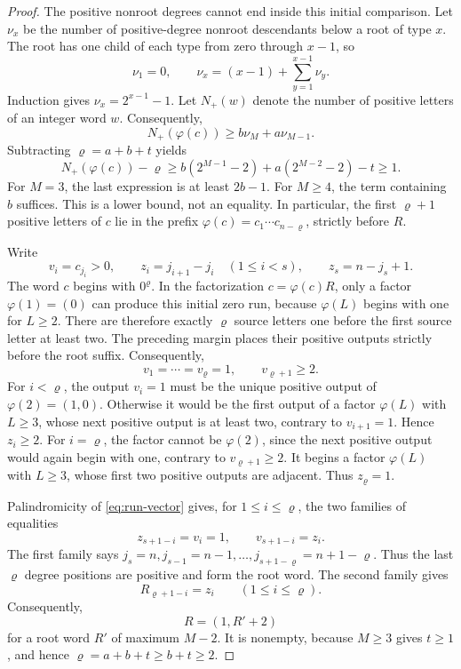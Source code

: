 \documentclass[10pt,a4paper]{amsart}
\begin{document}
\begin{proof}
The positive nonroot degrees cannot end inside this initial comparison.  Let
\(\nu_x\) be the number of positive-degree nonroot descendants below a root of
type \(x\).  The root has one child of each type from zero through \(x-1\),
so
\[
 \nu_1=0,
 \qquad
 \nu_x=(x-1)+\sum_{y=1}^{x-1}\nu_y.
\]
Induction gives \(\nu_x=2^{x-1}-1\).  Let \(N_+(w)\) denote the number of
positive letters of an integer word \(w\).  Consequently,
\[
 N_+(\varphi(c))\geq b\nu_M+a\nu_{M-1}.
\]
Subtracting \(\varrho=a+b+t\) yields
\begin{equation*}
 N_+(\varphi(c))-\varrho
 \geq b(2^{M-1}-2)+a(2^{M-2}-2)-t\geq1.
\end{equation*}
For \(M=3\), the last expression is at least \(2b-1\).  For \(M\geq4\), the
term containing \(b\) suffices.  This is a lower bound, not an equality.
In particular, the first \(\varrho+1\) positive letters of \(c\) lie in the
prefix \(\varphi(c)=c_1\cdots c_{n-\varrho}\), strictly before \(R\).

Write
\[
 v_i=c_{j_i}>0,
 \qquad
 z_i=j_{i+1}-j_i\quad(1\leq i<s),
 \qquad
 z_s=n-j_s+1.
\]
The word \(c\) begins with \(0^{\varrho}\).  In the factorization
\(c=\varphi(c)R\), only a factor \(\varphi(1)=(0)\) can produce this initial
zero run, because \(\varphi(L)\) begins with one for \(L\geq2\).  There are
therefore exactly \(\varrho\) source letters one before the first source
letter at least two.  The preceding margin places their positive outputs
strictly before the root suffix.  Consequently,
\[
 v_1=\cdots=v_{\varrho}=1,
 \qquad v_{\varrho+1}\geq2.
\]
For \(i<\varrho\), the output \(v_i=1\) must be the unique positive output of
\(\varphi(2)=(1,0)\).  Otherwise it would be the first output of a factor
\(\varphi(L)\) with \(L\geq3\), whose next positive output is at least two,
contrary to \(v_{i+1}=1\).  Hence \(z_i\geq2\).  For \(i=\varrho\), the
factor cannot be \(\varphi(2)\), since the next positive output would again
begin with one, contrary to \(v_{\varrho+1}\geq2\).  It begins a factor
\(\varphi(L)\) with \(L\geq3\), whose first two positive outputs are adjacent.
Thus \(z_{\varrho}=1\).

Palindromicity of \eqref{eq:run-vector} gives, for
\(1\leq i\leq\varrho\), the two families of equalities
\[
 z_{s+1-i}=v_i=1,
 \qquad
 v_{s+1-i}=z_i.
\]
The first family says
\(j_s=n,j_{s-1}=n-1,\ldots,j_{s+1-\varrho}=n+1-\varrho\).  Thus the last
\(\varrho\) degree positions are positive and form the root word.  The
second family gives
\[
 R_{\varrho+1-i}=z_i
 \qquad(1\leq i\leq\varrho).
\]
Consequently,
\begin{equation}
\label{eq:root-descent}
 R=(1,R'+2)
\end{equation}
for a root word \(R'\) of maximum \(M-2\).  It is nonempty, because
\(M\geq3\) gives \(t\geq1\), and hence
\(\varrho=a+b+t\geq b+t\geq2\).


\end{proof}
\end{document}
